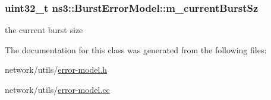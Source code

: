\subsubsection[{\texorpdfstring{m\+\_\+current\+Burst\+Sz}{m_currentBurstSz}}]{\setlength{\rightskip}{0pt plus 5cm}uint32\+\_\+t ns3\+::\+Burst\+Error\+Model\+::m\+\_\+current\+Burst\+Sz\hspace{0.3cm}{\ttfamily [private]}}\hypertarget{classns3_1_1BurstErrorModel_a976dfedc746d41733a789f969e25d0a9}{}\label{classns3_1_1BurstErrorModel_a976dfedc746d41733a789f969e25d0a9}


the current burst size 



The documentation for this class was generated from the following files\+:\begin{DoxyCompactItemize}
\item 
network/utils/\hyperlink{error-model_8h}{error-\/model.\+h}\item 
network/utils/\hyperlink{error-model_8cc}{error-\/model.\+cc}\end{DoxyCompactItemize}
